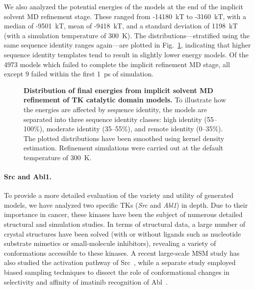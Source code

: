 \documentclass[10pt,letterpaper]{article}
\begin{document}
We also analyzed the potential energies of the models at the end of the implicit solvent MD refinement stage.
These ranged from -14180~kT to -3160~kT, with a median of -9501~kT, mean of -9418~kT, and a standard deviation of 1198~kT (with a simulation temperature of 300~K).
The distributions---stratified using the same sequence identity ranges again---are plotted in Fig.~\ref{figure:energies-implicit}, indicating that higher sequence identity templates tend to result in slightly lower energy models.
Of the \num{4973} models which failed to complete the implicit refinement MD stage, all except 9 failed within the first 1~ps of simulation.

\begin{figure}[h]

    \caption{{\bf Distribution of final energies from implicit solvent MD refinement of TK catalytic domain models.}
    To illustrate how the energies are affected by sequence identity, the models are separated into three sequence identity classes: high identity (55--100\%), moderate identity (35--55\%), and remote identity (0--35\%).
    The plotted distributions have been smoothed using kernel density estimation.
    Refinement simulations were carried out at the default temperature of 300~K.
  }
  \label{figure:energies-implicit}
\end{figure}

\paragraph{Src and Abl1.}

To provide a more detailed evaluation of the variety and utility of generated models, we have analyzed two specific TKs (\emph{Src} and \emph{Abl1}) in depth.
Due to their importance in cancer, these kinases have been the subject of numerous detailed structural and simulation studies.
In terms of structural data, a large number of crystal structures have been solved (with or without ligands such as nucleotide substrate mimetics or small-molecule inhibitors), revealing a variety of conformations accessible to these kinases.
A recent large-scale MSM study has also studied the activation pathway of Src~\cite{shukla-pande:nature-commun:2014:src-activation-msm}, while a separate study employed biased sampling techniques to dissect the role of conformational changes in selectivity and affinity of imatinib recognition of Abl~\cite{roux:pnas:2013:abl-imatinib}.
\end{document}
